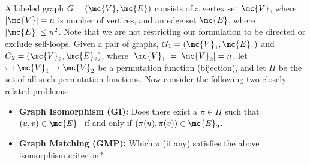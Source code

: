 \documentclass[10pt,journal,cspaper,compsoc]{IEEEtran}
\newcommand{\PmcP}{P \in \mc{P}}
\begin{document}
A labeled graph $G=(\mc{V},\mc{E})$ consists of a vertex set $\mc{V}$, where $|\mc{V}|=n$ is number of vertices, and an edge set $\mc{E}$, where $|\mc{E}| \leq n^2$. Note that we are not restricting our formulation to be directed or exclude self-loops. Given a pair of graphs, $G_1=(\mc{V}_1,\mc{E}_1)$ and $G_2=(\mc{V}_2,\mc{E}_2)$, where $|\mc{V}_1|=|\mc{V}_2|=n$, 
let $\pi: \mc{V}_1 \to \mc{V}_2$ be a permutation function (bijection),
and let $\Pi$ be the set of all such permutation functions.  Now consider the following two closely related problems:
\begin{itemize}
	\item \textbf{Graph Isomorphism (GI):}  Does there exist a $\pi \in \Pi$ such that $(u,v) \in \mc{E}_1$ if and only if $(\pi(u),\pi(v)) \in \mc{E}_2$. 
		\item \textbf{Graph Matching (GMP):} Which $\pi$ (if any) satisfies the above isomorphism criterion?
\end{itemize}

\end{document}
